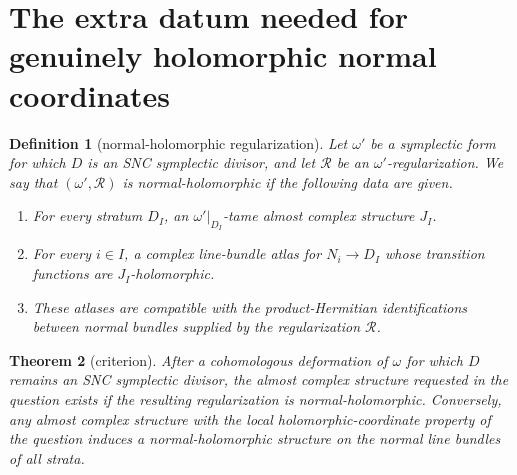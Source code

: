 \documentclass[11pt]{article}
\newtheorem{theorem}{Theorem}
\newtheorem{definition}[theorem]{Definition}
\newcommand{\RR}{\mathcal R}
\begin{document}
\section{The extra datum needed for genuinely holomorphic normal coordinates}

\begin{definition}[normal-holomorphic regularization]
Let \(\omega'\) be a symplectic form for which \(D\) is an SNC symplectic
divisor, and let \(\RR\) be an \(\omega'\)-regularization.  We say that
\((\omega',\RR)\) is \emph{normal-holomorphic} if the following data are given.

\begin{enumerate}
\item For every stratum \(D_I\), an \(\omega'|_{D_I}\)-tame almost complex
structure \(J_I\).

\item For every \(i\in I\), a complex line-bundle atlas for
\(N_i\to D_I\) whose transition functions are \(J_I\)-holomorphic.

\item These atlases are compatible with the product-Hermitian identifications
between normal bundles supplied by the regularization \(\RR\).
\end{enumerate}
\end{definition}

\begin{theorem}[criterion]
After a cohomologous deformation of \(\omega\) for which \(D\) remains an SNC
symplectic divisor, the almost complex structure requested in the question
exists if the resulting regularization is normal-holomorphic.  Conversely, any
almost complex structure with the local holomorphic-coordinate property of the
question induces a normal-holomorphic structure on the normal line bundles of
all strata.
\end{theorem}
\end{document}
